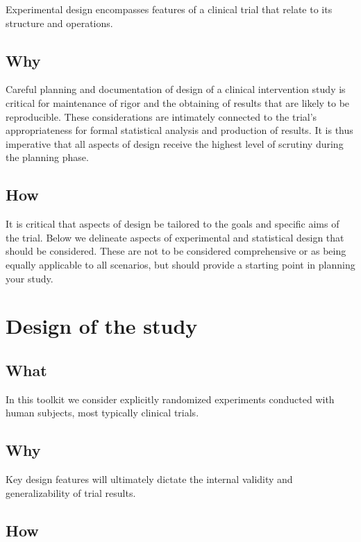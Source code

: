 \documentclass[]{book}
\begin{document}
Experimental design encompasses features of a clinical trial that relate
to its structure and operations.

\subsection{Why}\label{why}

Careful planning and documentation of design of a clinical intervention
study is critical for maintenance of rigor and the obtaining of results
that are likely to be reproducible. These considerations are intimately
connected to the trial's appropriateness for formal statistical analysis
and production of results. It is thus imperative that all aspects of
design receive the highest level of scrutiny during the planning phase.

\subsection{How}\label{how}

It is critical that aspects of design be tailored to the goals and
specific aims of the trial. Below we delineate aspects of experimental
and statistical design that should be considered. These are not to be
considered comprehensive or as being equally applicable to all
scenarios, but should provide a starting point in planning your study.

\section{Design of the study}\label{design-of-the-study}

\subsection{What}\label{what-1}

In this toolkit we consider explicitly randomized experiments conducted
with human subjects, most typically clinical trials.

\subsection{Why}\label{why-1}

Key design features will ultimately dictate the internal validity and
generalizability of trial results.

\subsection{How}\label{how-1}
\end{document}
